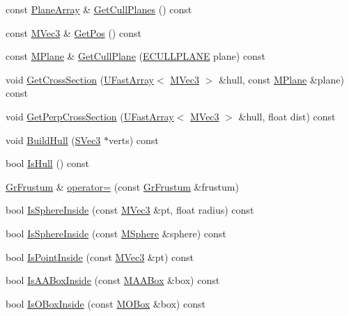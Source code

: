 \begin{CompactItemize}
\begin{CompactItemize}
\item 
const \hyperlink{class_u_fast_array}{PlaneArray} \& \hyperlink{class_gr_frustum_f95c1cb46f5234b2ac7428cb40610564}{GetCullPlanes} () const 
\item 
const \hyperlink{class_m_vec3}{MVec3} \& \hyperlink{class_gr_frustum_77885bad884903f7797f0432ca2ca1fb}{GetPos} () const 
\item 
const \hyperlink{class_m_plane}{MPlane} \& \hyperlink{class_gr_frustum_5727c08f1f0aba8e892df0bf07f9e4d9}{GetCullPlane} (\hyperlink{class_gr_frustum_75e33130cc18abc48f5f210454a62184}{ECULLPLANE} plane) const 
\item 
void \hyperlink{class_gr_frustum_ea6dd0973f8c4f3c5ca802b4344ceb39}{GetCrossSection} (\hyperlink{class_u_fast_array}{UFastArray}$<$ \hyperlink{class_m_vec3}{MVec3} $>$ \&hull, const \hyperlink{class_m_plane}{MPlane} \&plane) const 
\item 
void \hyperlink{class_gr_frustum_891ca292f3ba613b83c32636716aa337}{GetPerpCrossSection} (\hyperlink{class_u_fast_array}{UFastArray}$<$ \hyperlink{class_m_vec3}{MVec3} $>$ \&hull, float dist) const 
\item 
void \hyperlink{class_gr_frustum_a8381a57041f73df26588232ce5e94a3}{BuildHull} (\hyperlink{struct_s_vec3}{SVec3} $\ast$verts) const 
\item 
bool \hyperlink{class_gr_frustum_6bc615f0766acce17756f75c5c026318}{IsHull} () const 
\item 
\hyperlink{class_gr_frustum}{GrFrustum} \& \hyperlink{class_gr_frustum_6c27a46f836241026652b564115a8899}{operator=} (const \hyperlink{class_gr_frustum}{GrFrustum} \&frustum)
\item 
bool \hyperlink{class_gr_frustum_602085817d3ab40d3aa10dc6e60e5295}{IsSphereInside} (const \hyperlink{class_m_vec3}{MVec3} \&pt, float radius) const 
\item 
bool \hyperlink{class_gr_frustum_e5e75590acca54d5e79e27601d75fe12}{IsSphereInside} (const \hyperlink{class_m_sphere}{MSphere} \&sphere) const 
\item 
bool \hyperlink{class_gr_frustum_551cfdc1d421a551b99caadc765b6bb4}{IsPointInside} (const \hyperlink{class_m_vec3}{MVec3} \&pt) const 
\item 
bool \hyperlink{class_gr_frustum_2d3c8e27667405f7d98bcc8bb6e8ece5}{IsAABoxInside} (const \hyperlink{class_m_a_a_box}{MAABox} \&box) const 
\item 
bool \hyperlink{class_gr_frustum_3bb369beaea81bc56884ca295d95f0e7}{IsOBoxInside} (const \hyperlink{class_m_o_box}{MOBox} \&box) const 
\item 

\end{CompactItemize}
\end{CompactItemize}
